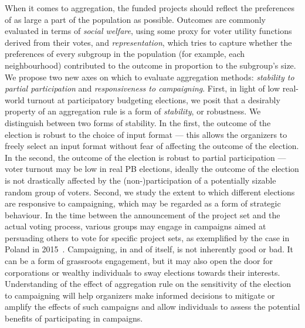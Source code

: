 \documentclass[mnsc,blindrev]{informs3_freeuse} %
\begin{document}
When it comes to aggregation,  the funded projects should   reflect the preferences of  as large a part of the population as possible. Outcomes are commonly evaluated in terms of \emph{social welfare}, using some proxy for voter utility functions derived from their votes, and \emph{representation}, which tries to capture whether the preferences of every subgroup in the population (for example, each neighbourhood) contributed to the outcome in proportion  to the subgroup's size. We propose two new axes on which to evaluate aggregation methods: \emph{stability to partial participation} and \emph{responsiveness to campaigning}. 
%
First, in light of low real-world turnout at participatory budgeting elections, we posit that  a desirably property of an aggregation rule is a form of \emph{stability}, or robustness. 
We distinguish between two forms of stability. In the first, the outcome of the election is robust to the choice of input format --- this allows the organizers to freely select an input format without fear of affecting the outcome of the election. In the second, the outcome of the election is robust to partial participation --- voter turnout may be low in real PB elections, ideally the outcome of the election is not drastically affected by the {(non-)participation} of a potentially sizable random   group of   voters. 
%
Second, we study the extent to which different elections are responsive to campaigning, which may be regarded as a form of strategic behaviour. In the time between    the announcement of the project set and the actual voting process, various groups may engage in campaigns aimed at persuading others to vote for specific project sets, as exemplified by the case in Poland in 2015~\citep{polko2015models}. Campaigning, in and of itself, is not inherently good or bad. It can be a form of grassroots engagement, but it may also open the door for corporations or wealthy individuals to sway elections towards their interests. 
Understanding of the effect of aggregation rule on the sensitivity of the election to campaigning will help organizers make informed decisions to mitigate or amplify the effects of such campaigns and allow individuals to assess the potential benefits of participating in campaigns.
\end{document}
